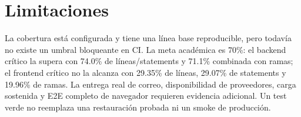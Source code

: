 \section{Limitaciones}

La cobertura está configurada y tiene una línea base reproducible, pero todavía no existe un umbral
bloqueante en CI. La meta académica es 70\%: el backend crítico la supera con 74.0\% de
líneas/statements y 71.1\% combinada con ramas; el frontend crítico no la alcanza con 29.35\% de
líneas, 29.07\% de statements y 19.96\% de ramas. La entrega real de correo, disponibilidad de
proveedores, carga sostenida y E2E completo de navegador requieren evidencia adicional. Un test
verde no reemplaza una restauración probada ni un smoke de producción.
